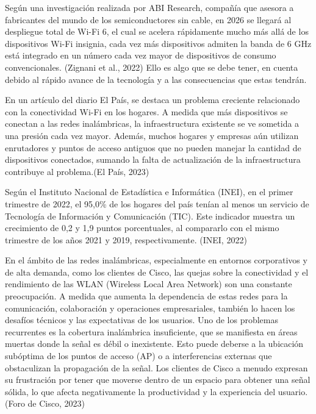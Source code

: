 Según una investigación realizada por ABI Research, compañía que asesora a fabricantes del mundo de los semiconductores sin cable, en 2026 se llegará al despliegue total de Wi-Fi 6, el cual se acelera rápidamente mucho más allá de los dispositivos Wi-Fi insignia, cada vez más dispositivos admiten la banda de 6 GHz está integrado en un número cada vez mayor de dispositivos de consumo convencionales. (Zignani et al., 2022) Ello es algo que se debe tener, en cuenta debido al rápido avance de la tecnología y a las consecuencias que estas tendrán.

En un artículo del diario El País, se destaca un problema creciente relacionado con la conectividad Wi-Fi en los hogares. A medida que más dispositivos se conectan a las redes inalámbricas, la infraestructura existente se ve sometida a una presión cada vez mayor. Además, muchos hogares y empresas aún utilizan enrutadores y puntos de acceso antiguos que no pueden manejar la cantidad de dispositivos conectados, sumando la falta de actualización de la infraestructura contribuye al problema.(El País, 2023)

Según el Instituto Nacional de Estadística e Informática (INEI), en el primer trimestre de 2022, el 95,0\% de los hogares del país tenían al menos un servicio de Tecnología de Información y Comunicación (TIC). Este indicador muestra un crecimiento de 0,2 y 1,9 puntos porcentuales, al compararlo con el mismo trimestre de los años 2021 y 2019, respectivamente. (INEI, 2022)

En el ámbito de las redes inalámbricas, especialmente en entornos corporativos y de alta demanda, como los clientes de Cisco, las quejas sobre la conectividad y el rendimiento de las WLAN (Wireless Local Area Network) son una constante preocupación. A medida que aumenta la dependencia de estas redes para la comunicación, colaboración y operaciones empresariales, también lo hacen los desafíos técnicos y las expectativas de los usuarios. Uno de los problemas recurrentes es la cobertura inalámbrica insuficiente, que se manifiesta en áreas muertas donde la señal es débil o inexistente. Esto puede deberse a la ubicación subóptima de los puntos de acceso (AP) o a interferencias externas que obstaculizan la propagación de la señal. Los clientes de Cisco a menudo expresan su frustración por tener que moverse dentro de un espacio para obtener una señal sólida, lo que afecta negativamente la productividad y la experiencia del usuario. (Foro de Cisco, 2023)

